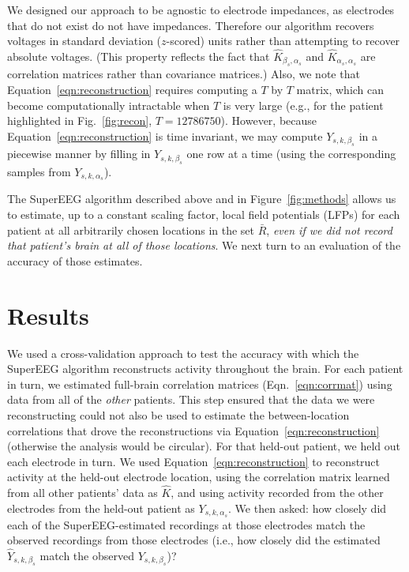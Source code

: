 \documentclass[11pt]{article}
\begin{document}
We designed our approach to be agnostic to electrode impedances, as
electrodes that do not exist do not have impedances.  Therefore our
algorithm recovers voltages in standard deviation ($z$-scored) units
rather than attempting to recover absolute voltages. (This property
reflects the fact that $\hat{K}_{\beta_s, \alpha_s}$ and
$\hat{K}_{\alpha_s, \alpha_s}$ are correlation matrices rather than
covariance matrices.)  Also, we note that
Equation~\ref{eqn:reconstruction} requires computing a $T$ by $T$
matrix, which can become computationally intractable when $T$ is very
large (e.g., for the patient highlighted in Fig.~\ref{fig:recon}, $T =
12786750$). However, because Equation~\ref{eqn:reconstruction} is time
invariant, we may compute $Y_{s,k,\beta_s}$ in a piecewise
manner by filling in $Y_{s,k,\beta_s}$ one row at a time (using the
corresponding samples from $Y_{s, k, \alpha_s}$).

The SuperEEG algorithm described above and in Figure~\ref{fig:methods}
allows us to estimate, up to a constant scaling factor, local field
potentials (LFPs) for each patient at all arbitrarily chosen locations
in the set $\bar{R}$, \textit{even if we did not record that patient's
  brain at all of those locations}.  We next turn to an evaluation of
the accuracy of those estimates.

\section*{Results}
We used a cross-validation approach to test the accuracy with which
the SuperEEG algorithm reconstructs activity throughout the brain.
For each patient in turn, we estimated full-brain correlation matrices
(Eqn.~\ref{eqn:corrmat}) using data from all of the \textit{other}
patients. This step ensured that the data we were reconstructing could
not also be used to estimate the between-location correlations that
drove the reconstructions via Equation~\ref{eqn:reconstruction}
(otherwise the analysis would be circular).  For that held-out
patient, we held out each electrode in turn.  We used
Equation~\ref{eqn:reconstruction} to reconstruct activity at the
held-out electrode location, using the correlation matrix learned from
all other patients' data as $\hat{K}$, and using activity recorded
from the other electrodes from the held-out patient as
$Y_{s, k, \alpha_s}$.  We then asked: how closely did each of the
SuperEEG-estimated recordings at those electrodes match the observed
recordings from those electrodes (i.e., how closely did the estimated
$\hat{Y}_{s, k, \beta_s}$ match the observed $Y_{s, k, \beta_s}$)?
\end{document}

